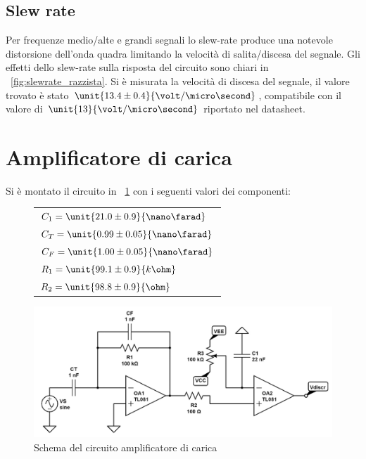 \documentclass[10pt,a4paper]{article}
\begin{document}
\subsection{Slew rate}
Per frequenze medio/alte e grandi segnali lo slew-rate produce una notevole distorsione dell'onda quadra limitando la velocità di salita/discesa del segnale. Gli effetti dello slew-rate sulla risposta del circuito sono chiari in \figurename{~\ref{fig:slewrate_razzista}}. Si è misurata la velocità di discesa del segnale, il valore trovato è stato $\unit{13.4 \pm 0.4}{\volt /\micro\second}$, compatibile con il valore di $\unit{13}{\volt / \micro\second}$ riportato nel datasheet.

\section{Amplificatore di carica}

Si è montato il circuito in \figurename{~\ref{circuio_ampli}} con i seguenti valori dei componenti:

\begin{figure}[H]
	\begin{minipage}{0.3\textwidth}
		\centering
		\begin{tabular}{l}
			$C_1 = \unit{21.0 \pm 0.9}{\nano\farad}$  \\ 
			$C_T = \unit{0.99 \pm 0.05}{\nano\farad}$ \\
			$C_F = \unit{1.00 \pm 0.05}{\nano\farad}$ \\
			$R_1 = \unit{99.1 \pm 0.9}{k\ohm}$  \\
			$R_2 = \unit{98.8 \pm 0.9}{\ohm}$
		\end{tabular}
	\end{minipage}
	\begin{minipage}{0.7\textwidth}
		\centering
		\includegraphics[width=\textwidth]{../circuiti/charge_amplifier.jpg}
		\caption{Schema del circuito amplificatore di carica}
		\label{circuio_ampli}
	\end{minipage}
\end{figure}
\end{document}
